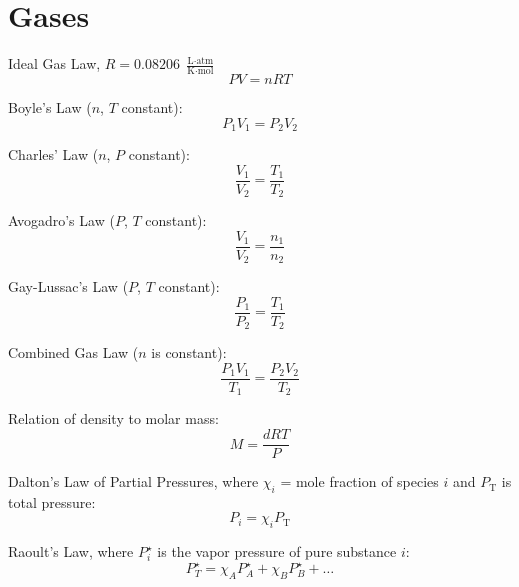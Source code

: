 \documentclass[10pt]{article}
\def\cd{$\cdot$}
\begin{document}
\section{Gases}


Ideal Gas Law, $R=0.08206$ $\frac{\textrm{L\cd atm}}{\textrm{K\cd mol}}$
\begin{equation*}
PV=nRT
\end{equation*}

Boyle's Law ($n$, $T$ constant):
\begin{equation*}
P_1V_1=P_2V_2
\end{equation*}

Charles' Law ($n$, $P$ constant):
\begin{equation*}
\frac{V_1}{V_2} = \frac{T_1}{T_2} 
\end{equation*}

Avogadro's Law ($P$, $T$ constant):
\begin{equation*}
\frac{V_1}{V_2} = \frac{n_1}{n_2} 
\end{equation*}

Gay-Lussac's Law ($P$, $T$ constant):
\begin{equation*}
\frac{P_1}{P_2} = \frac{T_1}{T_2} 
\end{equation*}

Combined Gas Law ($n$ is constant):
\begin{equation*}
\frac{P_1V_1}{T_1} = \frac{P_2V_2}{T_2}
\end{equation*}

Relation of density to molar mass:
\begin{equation*}
M = \frac{dRT}{P}
\end{equation*}

Dalton's Law of Partial Pressures, where $\chi_i$ = mole fraction of species $i$ and $P_\textrm{T}$ is total pressure:
\begin{equation*}
P_i=\chi_iP_\textrm{T}
\end{equation*} 

Raoult's Law, where $P_i^\star$ is the vapor pressure of pure substance $i$:
\begin{equation*}
P_T^\star=\chi_AP_A^\star + \chi_BP_B^\star + \dots
\end{equation*}
\end{document}
